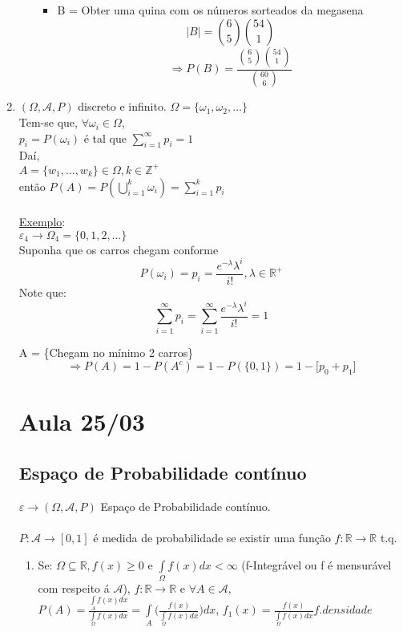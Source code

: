 \documentclass[a4paper,12pt]{article}
\begin{document}
\begin{enumerate}[label = \alph*)]
\begin{enumerate}[label=\textbf{\arabic*)}]
\begin{itemize}
	\item  B = Obter uma quina com os números sorteados da megasena
		$$ |B| = \binom{6}{5}\binom{54}{1} $$
			$$\Rightarrow P(B) = \frac{\binom{6}{5}\binom{54}{1}}{\binom{60}{6}} $$
\end{itemize}
\end{enumerate}
\newpage
\item $(\Omega,\mathscr{A},P)$ discreto e infinito.
$\Omega = \{ \omega_1,\omega_2,\ldots\}$\\
Tem-se que, $\forall \omega_i \in \Omega $,\\
$p_i=P(\omega_i)$ é tal que $\sum\limits_{i=1}^{\infty} p_i=1$\\
Daí,\\
$A=\{w_1,\ldots,w_k\} \in \Omega, k \in \mathbb{Z}^+$\\
então $P(A) = P(\bigcup\limits_{i=1}^{k}\omega_i) = \sum\limits_{i=1}^{k} p_i $\\
\\
\underline{Exemplo}:\\
$\varepsilon_4 \rightarrow \Omega_4=\{0,1,2,\ldots\}$\\
Suponha que os carros chegam conforme
$$P(\omega_i)=p_i=\frac{e^{-\lambda}\lambda^i}{i!}, \lambda \in \mathbb{R}^+ $$
Note que:
$$ \sum\limits_{i=1}^{\infty}p_i = \sum\limits_{i=1}^{\infty} \frac{e^{-\lambda}\lambda^i}{i!}=1$$

 A = \{Chegam no mínimo 2 carros\}
 $$\Rightarrow P(A)=1-P(A^c) = 1-P(\{0,1\}) = 1 - \bigg[ p_0 + p_1 \bigg] $$

\newpage

\section{Aula 25/03}
\subsection{Espaço de Probabilidade contínuo}
	$\varepsilon\longrightarrow(\Omega,\mathscr{A},P)$ Espaço de Probabilidade contínuo.\\
\\
$P:\mathscr{A}\longrightarrow[0,1]$ é medida de probabilidade se existir uma função $f:\mathbb{R}\rightarrow\mathbb{R}$ t.q.

\begin{enumerate}[label=\alph*)]
	\item Se: $ \Omega \subseteq \mathbb{R},f(x)\ge 0$ e $\int\limits_{\Omega} f(x)dx<\infty $ (f-Integrável ou f é  mensurável com respeito á $\mathscr{A}$), $f:\mathbb{R}\longrightarrow\mathbb{R}$ e  $\forall A\in\mathscr{A},$
	 $P(A)=\frac{\int\limits_{A}f(x)dx}{\int\limits_{\Omega}f(x)dx} = \int\limits_{A} \bigg(\frac{f(x)}{\int\limits_{\Omega} f(x)dx}\bigg)dx$,
	 $f_1(x)=\frac{f(x)}{\int\limits_{\Omega}f(x)dx} f.densidade $
	 

\end{enumerate}
\end{enumerate}
\end{document}
